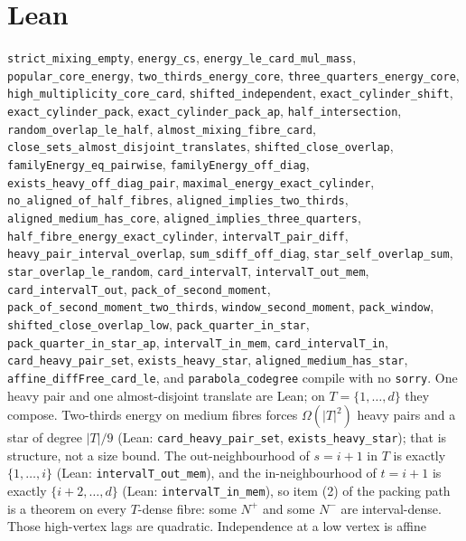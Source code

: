 \documentclass[11pt]{article}
\theoremstyle{definition}
\begin{document}
\section{Lean}

\texttt{strict\_mixing\_empty}, \texttt{energy\_cs},
\texttt{energy\_le\_card\_mul\_mass},
\texttt{popular\_core\_energy},
\texttt{two\_thirds\_energy\_core},
\texttt{three\_quarters\_energy\_core},
\texttt{high\_multiplicity\_core\_card},
\texttt{shifted\_independent}, \texttt{exact\_cylinder\_shift},
\texttt{exact\_cylinder\_pack},
\texttt{exact\_cylinder\_pack\_ap},
\texttt{half\_intersection},
\texttt{random\_overlap\_le\_half},
\texttt{almost\_mixing\_fibre\_card},
\texttt{close\_sets\_almost\_disjoint\_translates},
\texttt{shifted\_close\_overlap},
\texttt{familyEnergy\_eq\_pairwise},
\texttt{familyEnergy\_off\_diag},
\texttt{exists\_heavy\_off\_diag\_pair},
\texttt{maximal\_energy\_exact\_cylinder},
\texttt{no\_aligned\_of\_half\_fibres},
\texttt{aligned\_implies\_two\_thirds},
\texttt{aligned\_medium\_has\_core},
\texttt{aligned\_implies\_three\_quarters},
\texttt{half\_fibre\_energy\_exact\_cylinder},
\texttt{intervalT\_pair\_diff},
\texttt{heavy\_pair\_interval\_overlap},
\texttt{sum\_sdiff\_off\_diag},
\texttt{star\_self\_overlap\_sum},
\texttt{star\_overlap\_le\_random},
\texttt{card\_intervalT},
\texttt{intervalT\_out\_mem},
\texttt{card\_intervalT\_out},
\texttt{pack\_of\_second\_moment},
\texttt{pack\_of\_second\_moment\_two\_thirds},
\texttt{window\_second\_moment},
\texttt{pack\_window},
\texttt{shifted\_close\_overlap\_low},
\texttt{pack\_quarter\_in\_star},
\texttt{pack\_quarter\_in\_star\_ap},
\texttt{intervalT\_in\_mem},
\texttt{card\_intervalT\_in},
\texttt{card\_heavy\_pair\_set},
\texttt{exists\_heavy\_star},
\texttt{aligned\_medium\_has\_star},
\texttt{affine\_diffFree\_card\_le}, and \texttt{parabola\_codegree}
compile with no \texttt{sorry}.
One heavy pair and one almost-disjoint translate are Lean; on
$T=\{1,\dots,d\}$ they compose.
Two-thirds energy on medium fibres forces $\Omega(|T|^{2})$ heavy
pairs and a star of degree $|T|/9$
(Lean: \texttt{card\_heavy\_pair\_set}, \texttt{exists\_heavy\_star});
that is structure, not a size bound.
The out-neighbourhood of $s=i+1$ in $T$ is exactly $\{1,\dots,i\}$
(Lean: \texttt{intervalT\_out\_mem}), and the in-neighbourhood of
$t=i+1$ is exactly $\{i+2,\dots,d\}$
(Lean: \texttt{intervalT\_in\_mem}), so item (2) of the packing path
is a theorem on every $T$-dense fibre: some $N^+$ and some $N^-$ are
interval-dense.
Those high-vertex lags are quadratic.
Independence at a low vertex is affine
\end{document}
